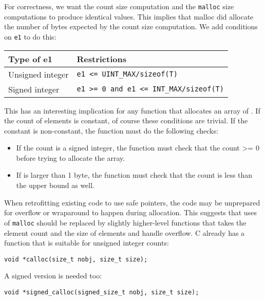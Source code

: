 For correctness, we want the count size computation and the
\texttt{malloc} size computations to produce identical values. This
implies that malloc did allocate the number of bytes expected by the
count size computation. We add conditions on \texttt{e1} to do this:

\begin{longtable}[c]{@{}ll@{}}
\toprule
Type of e1 & Restrictions\tabularnewline
\midrule
\endhead
Unsigned integer & \texttt{e1 \textless{}=
UINT\_MAX/sizeof(T)}\tabularnewline
Signed integer & \texttt{e1 \textgreater{}= 0 and e1 \textless{}=
INT\_MAX/sizeof(T)}\tabularnewline
\bottomrule
\end{longtable}

This has an interesting implication for any function that allocates an
array of . If the count of elements is constant, of course these
conditions are trivial. If the constant is non-constant, the function
must do the following checks:

\begin{itemize}
\item
  If the count is a signed integer, the function must check that the
  count \textgreater{}= 0 before trying to allocate the array.
\item
  If  is larger than 1 byte, the function must check that the
  count is less than the upper bound as well.
\end{itemize}

When retrofitting existing code to use safe pointers, the code may be
unprepared for overflow or wraparound to happen during allocation. This
suggests that uses of \texttt{malloc} should be replaced by slightly
higher-level functions that takes the element count and the size of
elements and handle overflow. C already has a function that is suitable
for unsigned integer counts:

\begin{verbatim}
void *calloc(size_t nobj, size_t size);
\end{verbatim}

A signed version is needed too:

\begin{verbatim}
void *signed_calloc(signed_size_t nobj, size_t size);
\end{verbatim}
